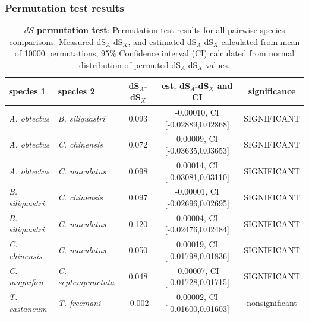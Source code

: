 \documentclass{article}
\begin{document}
\subsubsection*{Permutation test results}

\begin{table}[H]
    \centering
    \caption{\textbf{$dS$ permutation test}: Permutation test results for all pairwise species comparisons. Measured dS$_A$-dS$_X$, and estimated dS$_A$-dS$_X$ calculated from mean of
    10000 permutations, 95\% Confidence interval (CI) calculated from normal distribution of permuted dS$_A$-dS$_X$ values.}
    \label{SItab:dS_permutation}
    \begin{tabular}{l | l | c |c | c}
        species 1  & species 2 & dS$_A$-dS$_X$ & est. dS$_A$-dS$_X$ and CI & significance \\
        \hline
        \hline	 
        \textit{A. obtectus} & \textit{B. siliquastri} & 0.093 & -0.00010, CI [-0.02889,0.02868] & SIGNIFICANT \\
        \hline
        \textit{A. obtectus} & \textit{C. chinensis} & 0.072 &  0.00009, CI [-0.03635,0.03653] & SIGNIFICANT \\
        \hline
        \textit{A. obtectus} & \textit{C. maculatus} & 0.098 &  0.00014, CI [-0.03081,0.03110] & SIGNIFICANT \\
        \hline
        \textit{B. siliquastri} & \textit{C. chinensis} & 0.097 & -0.00001, CI [-0.02696,0.02695] & SIGNIFICANT \\
        \hline
        \textit{B. siliquastri} & \textit{C. maculatus} & 0.120 &  0.00004, CI [-0.02476,0.02484] & SIGNIFICANT \\
        \hline
        \textit{C. chinensis} & \textit{C. maculatus} & 0.050 &  0.00019, CI [-0.01798,0.01836] & SIGNIFICANT \\
        \hline
        \hline
        \textit{C. magnifica} & \textit{C. septempunctata} & 0.048 & -0.00007, CI [-0.01728,0.01715] & SIGNIFICANT \\
        \hline
        \textit{T. castaneum} & \textit{T. freemani} & -0.002 & 0.00002, CI [-0.01600,0.01603] & nonsignificant \\
        \hline
    \end{tabular}
\end{table}
\end{document}
